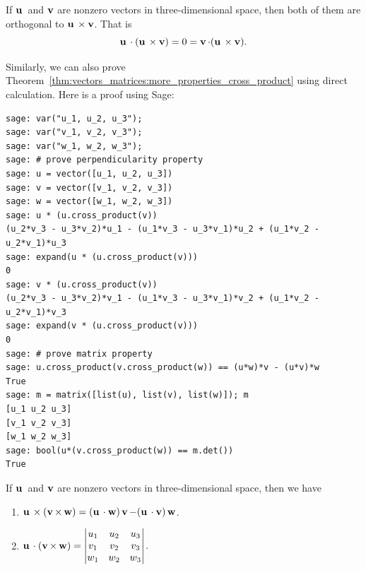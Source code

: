 \begin{theorem}
\label{thm:vectors_matrices:u_v_parallel_u_dot_v}
If $\operatorname*{\mathbf{u}}{}$ and $\operatorname*{\mathbf{v}}$ are nonzero vectors in three-dimensional space,
then both of them are orthogonal to $\operatorname*{\mathbf{u}}{} \times \operatorname*{\mathbf{v}}$. That is
\[
\operatorname*{\mathbf{u}}{} \cdot (\operatorname*{\mathbf{u}}{} \times \operatorname*{\mathbf{v}})
=
0
=
\operatorname*{\mathbf{v}} \cdot (\operatorname*{\mathbf{u}}{} \times \operatorname*{\mathbf{v}}).
\]
\end{theorem}

Similarly, we can also prove
Theorem~\ref{thm:vectors_matrices:more_properties_cross_product} using
direct calculation. Here is a proof using Sage:
%
\begin{lstlisting}
sage: var("u_1, u_2, u_3");
sage: var("v_1, v_2, v_3");
sage: var("w_1, w_2, w_3");
sage: # prove perpendicularity property
sage: u = vector([u_1, u_2, u_3])
sage: v = vector([v_1, v_2, v_3])
sage: w = vector([w_1, w_2, w_3])
sage: u * (u.cross_product(v))
(u_2*v_3 - u_3*v_2)*u_1 - (u_1*v_3 - u_3*v_1)*u_2 + (u_1*v_2 - u_2*v_1)*u_3
sage: expand(u * (u.cross_product(v)))
0
sage: v * (u.cross_product(v))
(u_2*v_3 - u_3*v_2)*v_1 - (u_1*v_3 - u_3*v_1)*v_2 + (u_1*v_2 - u_2*v_1)*v_3
sage: expand(v * (u.cross_product(v)))
0
sage: # prove matrix property
sage: u.cross_product(v.cross_product(w)) == (u*w)*v - (u*v)*w
True
sage: m = matrix([list(u), list(v), list(w)]); m
[u_1 u_2 u_3]
[v_1 v_2 v_3]
[w_1 w_2 w_3]
sage: bool(u*(v.cross_product(w)) == m.det())
True
\end{lstlisting}

\begin{theorem}
\label{thm:vectors_matrices:more_properties_cross_product}
If $\operatorname*{\mathbf{u}}{}$ and $\operatorname*{\mathbf{v}}$ are nonzero vectors in three-dimensional space,
then we have
%
\begin{enumerate}
\item
  $\operatorname*{\mathbf{u}}{} \times (\operatorname*{\mathbf{v}} \times \operatorname*{\mathbf{w}})
  =
  (\operatorname*{\mathbf{u}}{} \cdot \operatorname*{\mathbf{w}}) \operatorname*{\mathbf{v}} - (\operatorname*{\mathbf{u}}{} \cdot \operatorname*{\mathbf{v}}) \operatorname*{\mathbf{w}}$.

\item
  $\operatorname*{\mathbf{u}}{} \cdot (\operatorname*{\mathbf{v}} \times \operatorname*{\mathbf{w}})
  =
  \begin{vmatrix}
    u_1 & u_2 & u_3 \\
    v_1 & v_2 & v_3 \\
    w_1 & w_2 & w_3
  \end{vmatrix}$.
\end{enumerate}
\end{theorem}
